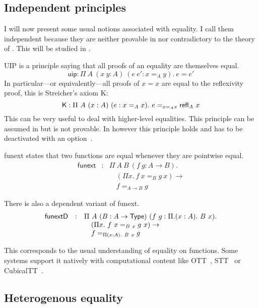 \subsection{Independent principles}

I will now present some usual notions associated with equality. I call them
independent because they are neither provable in nor contradictory to the theory
of \Coq. This will be studied in .


\acrshort{UIP} is a principle saying that all proofs of an equality are
themselves equal.
\[
  \mathsf{uip} : \Pi\ A\ (x\ y : A)\ (e \ e' : x =_A y).\ e = e'
\]
In particular---or equivalently---all proofs of \(x = x\) are equal to the
reflexivity proof, this is Streicher's axiom K:
\[
  \mathsf{K} : \Pi\ A\ (x : A)\ (e : x =_A x).\ e =_{x =_A x} {\mathsf{refl}}_{A}\  x
\]
This can be very useful to deal with higher-level equalities.
This principle can be assumed in \Coq but is not provable. In \Agda however this
principle holds and has to be deactivated with an
option~.


\Acrshort{funext} states that two functions are equal whenever they are
pointwise equal.
\[
  \begin{array}{lcl}
    \mathsf{funext} &:&
    \Pi\ A\ B\ (f\ g : A \to B).\\
    && \quad (\Pi x.\ f\ x =_B g\ x) \to \\
    && \quad f =_{A \to B} g
  \end{array}
\]

There is also a dependent variant of \acrshort{funext}.
\[
  \begin{array}{lcl}
    \mathsf{funextD} &:&
    \Pi\ A\ (B : A \to \mathsf{Type})\ (f\ g : \Pi. (x : A).\ B\ x).\\
    && \quad (\Pi x.\ f\ x =_{B\ x} g\ x) \to \\
    && \quad f =_{\Pi (x:A).\ B\ x} g
  \end{array}
\]

This corresponds to the usual understanding of equality on functions.
Some systems support it natively with computational content like
\acrfull{OTT}~,
\acrfull{STT}~ or
\acrfull{CubicalTT}~.


\subsection{Heterogenous equality}

